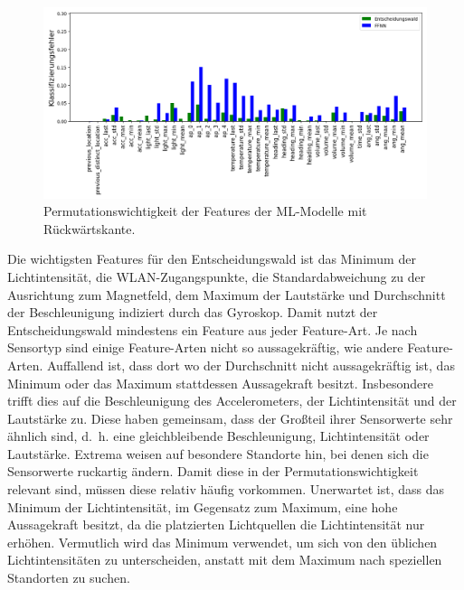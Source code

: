 \begin{figure}[h!]
    \centering
    \includegraphics[width=\linewidth]{images/fi_consolidated.png}
    \caption{Permutationswichtigkeit der Features der ML-Modelle mit Rückwärtskante.}
    \label{fig:fi_consolidated}
\end{figure}
\newline
\newline
Die wichtigsten Features für den Entscheidungswald ist das Minimum der Lichtintensität, die WLAN-Zugangspunkte, die Standardabweichung zu der Ausrichtung zum Magnetfeld,
dem Maximum der Lautstärke und Durchschnitt der Beschleunigung indiziert durch das Gyroskop.
Damit nutzt der Entscheidungswald mindestens ein Feature aus jeder Feature-Art.
Je nach Sensortyp sind einige Feature-Arten nicht so aussagekräftig, wie andere Feature-Arten.
\newline
\newline
Auffallend ist, dass dort wo der Durchschnitt nicht aussagekräftig ist, das Minimum oder das Maximum stattdessen Aussagekraft besitzt.
Insbesondere trifft dies auf die Beschleunigung des Accelerometers, der Lichtintensität und der Lautstärke zu.
Diese haben gemeinsam, dass der Großteil ihrer Sensorwerte sehr ähnlich sind,
d.~h. eine gleichbleibende Beschleunigung, Lichtintensität oder Lautstärke.
Extrema weisen auf besondere Standorte hin, bei denen sich die Sensorwerte ruckartig ändern.
Damit diese in der Permutationswichtigkeit relevant sind, müssen diese relativ häufig vorkommen.
Unerwartet ist, dass das Minimum der Lichtintensität, im Gegensatz zum Maximum, eine hohe Aussagekraft besitzt, da die platzierten Lichtquellen die Lichtintensität nur erhöhen.
Vermutlich wird das Minimum verwendet, um sich von den üblichen Lichtintensitäten zu unterscheiden, anstatt mit dem Maximum nach speziellen Standorten zu suchen.
\newline
\newline
